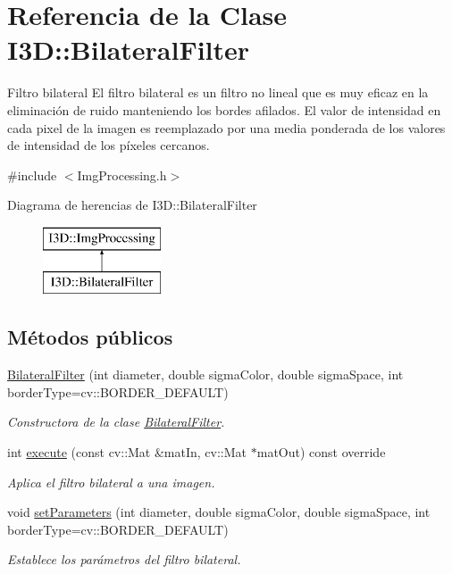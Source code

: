 \hypertarget{class_i3_d_1_1_bilateral_filter}{}\section{Referencia de la Clase I3D\+:\+:Bilateral\+Filter}
\label{class_i3_d_1_1_bilateral_filter}


Filtro bilateral El filtro bilateral es un filtro no lineal que es muy eficaz en la eliminación de ruido manteniendo los bordes afilados. El valor de intensidad en cada pixel de la imagen es reemplazado por una media ponderada de los valores de intensidad de los píxeles cercanos.  




{\ttfamily \#include $<$Img\+Processing.\+h$>$}

Diagrama de herencias de I3D\+:\+:Bilateral\+Filter\begin{figure}[H]
\begin{center}
\leavevmode
\includegraphics[height=2.000000cm]{class_i3_d_1_1_bilateral_filter}
\end{center}
\end{figure}
\subsection*{Métodos públicos}
\begin{DoxyCompactItemize}
\item 
\hyperlink{class_i3_d_1_1_bilateral_filter_af234e215c72e3a9a99e6e51679be0db8}{Bilateral\+Filter} (int diameter, double sigma\+Color, double sigma\+Space, int border\+Type=cv\+::\+B\+O\+R\+D\+E\+R\+\_\+\+D\+E\+F\+A\+U\+LT)
\begin{DoxyCompactList}\small\item\em Constructora de la clase \hyperlink{class_i3_d_1_1_bilateral_filter}{Bilateral\+Filter}. \end{DoxyCompactList}\item 
int \hyperlink{class_i3_d_1_1_bilateral_filter_a4b606ce8517fbd44dd1734e1a54bab10}{execute} (const cv\+::\+Mat \&mat\+In, cv\+::\+Mat $\ast$mat\+Out) const  override
\begin{DoxyCompactList}\small\item\em Aplica el filtro bilateral a una imagen. \end{DoxyCompactList}\item 
void \hyperlink{class_i3_d_1_1_bilateral_filter_acd2e8cf80d29f59a88e229dc7f966ed9}{set\+Parameters} (int diameter, double sigma\+Color, double sigma\+Space, int border\+Type=cv\+::\+B\+O\+R\+D\+E\+R\+\_\+\+D\+E\+F\+A\+U\+LT)
\begin{DoxyCompactList}\small\item\em Establece los parámetros del filtro bilateral. \end{DoxyCompactList}\end{DoxyCompactItemize}

